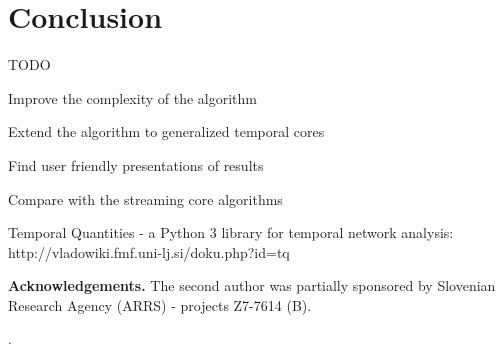\documentclass[a4paper,twoside,10pt]{article}
\begin{document}
%
%
\section{Conclusion}
TODO

Improve the complexity of the algorithm

Extend the algorithm to generalized temporal cores

Find user friendly presentations of results

Compare with the streaming core algorithms

Temporal Quantities - a Python 3 library for temporal network analysis: http://vladowiki.fmf.uni-lj.si/doku.php?id=tq

\textbf{Acknowledgements.}
The second author was partially sponsored by Slovenian Research Agency (ARRS) - projects Z7-7614 (B).



\nocite{*} %
.
\end{document}
